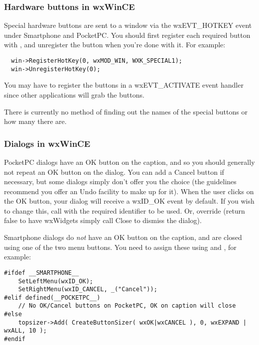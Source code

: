 \subsubsection{Hardware buttons in wxWinCE}

Special hardware buttons are sent to a window via the wxEVT\_HOTKEY event
under Smartphone and PocketPC. You should first register each required button with ,
and unregister the button when you're done with it. For example:

\begin{verbatim}
  win->RegisterHotKey(0, wxMOD_WIN, WXK_SPECIAL1);
  win->UnregisterHotKey(0);
\end{verbatim}

You may have to register the buttons in a wxEVT\_ACTIVATE event handler
since other applications will grab the buttons.

There is currently no method of finding out the names of the special
buttons or how many there are.

\subsubsection{Dialogs in wxWinCE}

PocketPC dialogs have an OK button on the caption, and so you should generally
not repeat an OK button on the dialog. You can add a Cancel button if necessary, but some dialogs
simply don't offer you the choice (the guidelines recommend you offer an Undo facility
to make up for it). When the user clicks on the OK button, your dialog will receive
a wxID\_OK event by default. If you wish to change this, call 
with the required identifier to be used. Or, override  (return false to
have wxWidgets simply call Close to dismiss the dialog).

Smartphone dialogs do {\it not} have an OK button on the caption, and are closed
using one of the two menu buttons. You need to assign these using 
and , for example:

\begin{verbatim}
#ifdef __SMARTPHONE__
    SetLeftMenu(wxID_OK);
    SetRightMenu(wxID_CANCEL, _("Cancel"));
#elif defined(__POCKETPC__)
    // No OK/Cancel buttons on PocketPC, OK on caption will close
#else
    topsizer->Add( CreateButtonSizer( wxOK|wxCANCEL ), 0, wxEXPAND | wxALL, 10 );
#endif
\end{verbatim}

